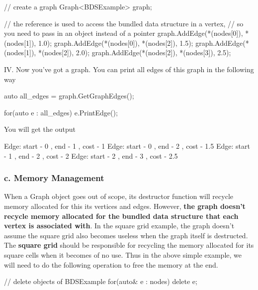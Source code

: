 \begin{DoxyCode}
\textcolor{comment}{// create a graph}
Graph<BDSExample> graph;

\textcolor{comment}{// the reference is used to access the bundled data structure in a vertex,}
\textcolor{comment}{//  so you need to pass in an object instead of a pointer}
graph.AddEdge(*(nodes[0]), *(nodes[1]), 1.0);
graph.AddEdge(*(nodes[0]), *(nodes[2]), 1.5);
graph.AddEdge(*(nodes[1]), *(nodes[2]), 2.0);
graph.AddEdge(*(nodes[2]), *(nodes[3]), 2.5);
\end{DoxyCode}


I\-V. Now you've got a graph. You can print all edges of this graph in the following way


\begin{DoxyCode}
\textcolor{keyword}{auto} all\_edges = graph.GetGraphEdges();

\textcolor{keywordflow}{for}(\textcolor{keyword}{auto} e : all\_edges)
    e.PrintEdge();
\end{DoxyCode}


You will get the output


\begin{DoxyCode}
Edge: start - 0 , end - 1 , cost - 1
Edge: start - 0 , end - 2 , cost - 1.5
Edge: start - 1 , end - 2 , cost - 2
Edge: start - 2 , end - 3 , cost - 2.5
\end{DoxyCode}


\subsubsection*{c. Memory Management}

When a Graph object goes out of scope, its destructor function will recycle memory allocated for this its vertices and edges. However, {\bfseries the graph doesn't recycle memory allocated for the bundled data structure that each vertex is associated with}. In the square grid example, the graph doesn't assume the square grid also becomes useless when the graph itself is destructed. The {\bfseries square grid} should be responsible for recycling the memory allocated for its square cells when it becomes of no use. Thus in the above simple example, we will need to do the following operation to free the memory at the end.


\begin{DoxyCode}
\textcolor{comment}{// delete objects of BDSExample}
\textcolor{keywordflow}{for}(\textcolor{keyword}{auto}& e : nodes)
        \textcolor{keyword}{delete} e;
\end{DoxyCode}


